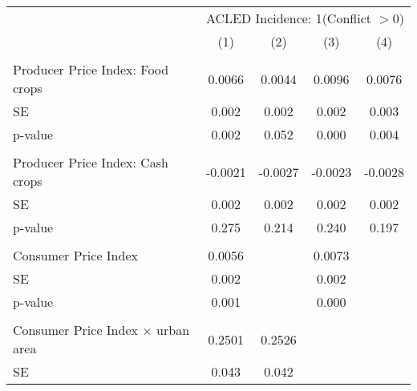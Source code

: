 {
\def\sym#1{\ifmmode^{#1}\else\(^{#1}\)\fi}
\begin{tabular}{l*{4}{c}}
\hline\hline
                    &\multicolumn{4}{c}{ACLED Incidence: 1(Conflict $>0$)}                                  \\\cmidrule(lr){2-5}
                    &\multicolumn{1}{c}{(1)}         &\multicolumn{1}{c}{(2)}         &\multicolumn{1}{c}{(3)}         &\multicolumn{1}{c}{(4)}         \\
\hline
\hline
\\  Producer Price Index: Food crops&      0.0066         &      0.0044         &      0.0096         &      0.0076         \\
\hspace{15pt} SE    &       0.002         &       0.002         &       0.002         &       0.003         \\
\hspace{15pt} p-value&       0.002         &       0.052         &       0.000         &       0.004         \\
\\  Producer Price Index: Cash crops&     -0.0021         &     -0.0027         &     -0.0023         &     -0.0028         \\
\hspace{15pt} SE    &       0.002         &       0.002         &       0.002         &       0.002         \\
\hspace{15pt} p-value&       0.275         &       0.214         &       0.240         &       0.197         \\
\\ Consumer Price Index&      0.0056         &                     &      0.0073         &                     \\
\hspace{15pt} SE    &       0.002         &                     &       0.002         &                     \\
\hspace{15pt} p-value&       0.001         &                     &       0.000         &                     \\
\\  Consumer Price Index $\times$ urban area&      0.2501         &      0.2526         &                     &                     \\
\hspace{15pt} SE    &       0.043         &       0.042         &                     &                     \\

\end{tabular}}

